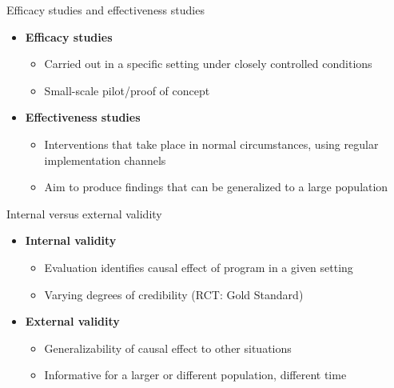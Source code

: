\documentclass[
  ignorenonframetext,
]{beamer}
\providecommand{\tightlist}{%
  \setlength{\itemsep}{0pt}\setlength{\parskip}{0pt}}
\begin{document}
\begin{frame}{Efficacy studies and effectiveness studies}
\label{efficacy-studies-and-effectiveness-studies}
\begin{itemize}
\tightlist
\item
  \textbf{Efficacy studies}

  \begin{itemize}
  \tightlist
  \item
    Carried out in a specific setting under closely controlled
    conditions\\
  \item
    Small-scale pilot/proof of concept\\
  \end{itemize}
\item
  \textbf{Effectiveness studies}

  \begin{itemize}
  \tightlist
  \item
    Interventions that take place in normal circumstances, using regular
    implementation channels\\
  \item
    Aim to produce findings that can be generalized to a large
    population
  \end{itemize}
\end{itemize}
\end{frame}

\begin{frame}{Internal versus external validity}
\label{internal-versus-external-validity}
\begin{itemize}
\tightlist
\item
  \textbf{Internal validity}

  \begin{itemize}
  \tightlist
  \item
    Evaluation identifies causal effect of program in a given setting\\
  \item
    Varying degrees of credibility (RCT: Gold Standard)\\
  \end{itemize}
\item
  \textbf{External validity}

  \begin{itemize}
  \tightlist
  \item
    Generalizability of causal effect to other situations\\
  \item
    Informative for a larger or different population, different time
  \end{itemize}
\end{itemize}
\end{frame}
\end{document}
